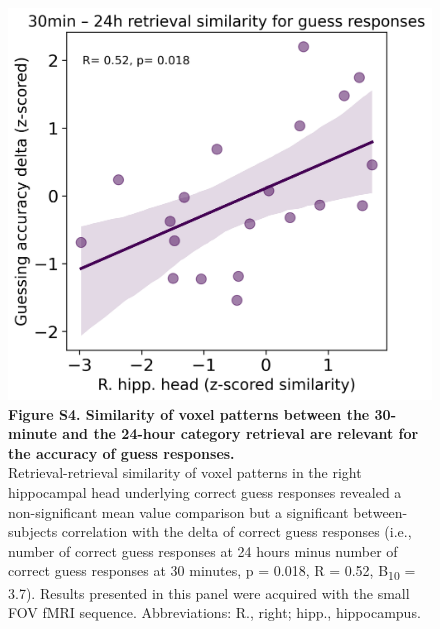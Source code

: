  \begin{figure}[!ht]
    \centering
     \includegraphics[width=\linewidth/2]{paper/src/figures/20240530_hipp-array_n_ret1_ret2_perm_consc_unconsc_corr-unconsc_incorr_R. hipp. head_ERS_correl.png}
     \caption*{\textbf{Figure S4. Similarity of voxel patterns between the 30-minute and the 24-hour category retrieval are relevant for the accuracy of guess responses.} \\ \vspace{0.5em}
Retrieval-retrieval similarity of voxel patterns in the right hippocampal head underlying correct guess responses revealed a non-significant mean value comparison but a significant between-subjects correlation with the delta of correct guess responses (i.e., number of correct guess responses at 24 hours minus number of correct guess responses at 30 minutes, p = 0.018, R = 0.52, B\textsubscript{10} = 3.7). Results presented in this panel were acquired with the small FOV fMRI sequence. Abbreviations: R., right; hipp., hippocampus.}
\end{figure}



\newpage

